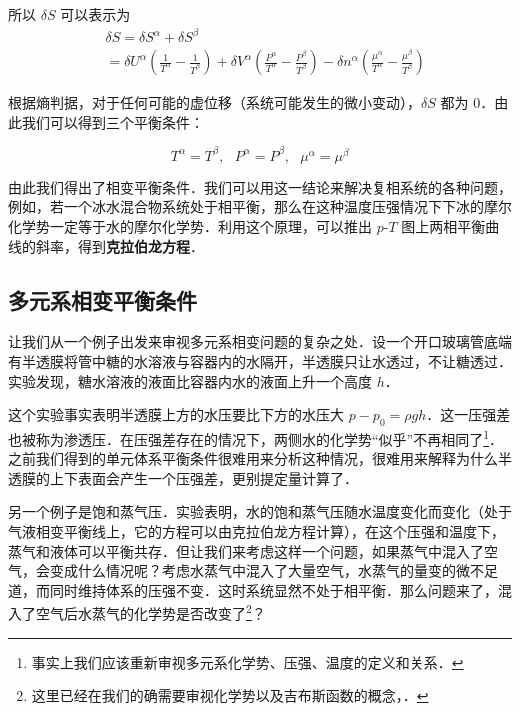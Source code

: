 所以 $\delta S$ 可以表示为
\begin{equation}
\begin{aligned}
&\delta S=\delta S^\alpha+\delta S^\beta\\&=\delta U^\alpha\left(\frac{1}{T^\alpha}-\frac{1}{T^\beta}\right)+\delta V^\alpha\left(\frac{P^\alpha}{T^\alpha}-\frac{P^\beta}{T^\beta}\right)
-\delta n^\alpha\left(\frac{\mu^\alpha}{T^\alpha}-\frac{\mu^\beta}{T^\beta}\right)
\end{aligned}
\end{equation}

根据熵判据，对于任何可能的虚位移（系统可能发生的微小变动），$\delta S$ 都为 $0$．由此我们可以得到三个平衡条件：

\begin{equation}
T^\alpha=T^\beta,\ \ \ P^\alpha=P^\beta,\ \ \ \mu^\alpha=\mu^\beta
\end{equation}

由此我们得出了相变平衡条件．我们可以用这一结论来解决复相系统的各种问题，例如，若一个冰水混合物系统处于相平衡，那么在这种温度压强情况下下冰的摩尔化学势一定等于水的摩尔化学势．利用这个原理，可以推出 $p$-$T$ 图上两相平衡曲线的斜率，得到\textbf{克拉伯龙方程}．

\subsection{多元系相变平衡条件}

让我们从一个例子出发来审视多元系相变问题的复杂之处．设一个开口玻璃管底端有半透膜将管中糖的水溶液与容器内的水隔开，半透膜只让水透过，不让糖透过．实验发现，糖水溶液的液面比容器内水的液面上升一个高度 $h$．

这个实验事实表明半透膜上方的水压要比下方的水压大 $p-p_0=\rho g h$．这一压强差也被称为渗透压．在压强差存在的情况下，两侧水的化学势“似乎”不再相同了\footnote{事实上我们应该重新审视多元系化学势、压强、温度的定义和关系．}．之前我们得到的单元体系平衡条件很难用来分析这种情况，很难用来解释为什么半透膜的上下表面会产生一个压强差，更别提定量计算了．

另一个例子是饱和蒸气压．实验表明，水的饱和蒸气压随水温度变化而变化（处于气液相变平衡线上，它的方程可以由克拉伯龙方程计算），在这个压强和温度下，蒸气和液体可以平衡共存．但让我们来考虑这样一个问题，如果蒸气中混入了空气，会变成什么情况呢？考虑水蒸气中混入了大量空气，水蒸气的量变的微不足道，而同时维持体系的压强不变．这时系统显然不处于相平衡．那么问题来了，混入了空气后水蒸气的化学势是否改变了\footnote{这里已经在我们的确需要审视化学势以及吉布斯函数的概念，．}？